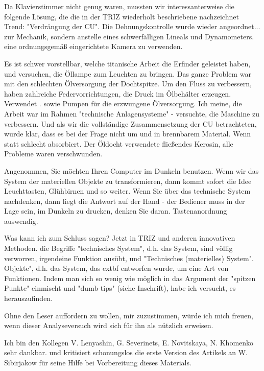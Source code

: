 \documentclass[11pt,a4paper]{article}
\begin{document}
{{Da Klavierstimmer nicht genug waren, mussten wir interessanterweise
die folgende Lösung, die die in der TRIZ wiederholt beschriebene nachzeichnet
Trend: "Verdrängung der CU". Die Dehnungskontrolle wurde wieder angeordnet...
zur Mechanik, sondern anstelle eines schwerfälligen Lineals und Dynamometers.
eine ordnungsgemäß eingerichtete Kamera zu verwenden.

Es ist schwer vorstellbar, welche titanische Arbeit die Erfinder geleistet haben,
und versuchen, die Öllampe zum Leuchten zu bringen. Das ganze Problem war mit den schlechten
Ölversorgung der Dochtspitze. Um den Fluss zu verbessern, haben zahlreiche
Federvorrichtungen, die Druck im Ölbehälter erzeugen. Verwendet .
sowie Pumpen für die erzwungene Ölversorgung. Ich meine, die Arbeit war im Rahmen
"technische Anlagensysteme" - versuchte, die Maschine zu verbessern. 
Und als wir die vollständige Zusammensetzung der CU betrachteten, wurde klar, dass es bei der Frage nicht um
und in brennbarem Material. Wenn statt schlecht absorbiert.
Der Öldocht verwendete fließendes Kerosin, alle Probleme waren verschwunden. 

Angenommen, Sie möchten Ihren Computer im Dunkeln benutzen. Wenn wir
das System der materiellen Objekte zu transformieren, dann kommt sofort die Idee
Leuchttasten, Glühbirnen und so weiter. Wenn Sie über das technische System nachdenken,
dann liegt die Antwort auf der Hand - der Bediener muss in der Lage sein, im Dunkeln zu drucken, denken Sie daran.
Tastenanordnung auswendig.


Was kann ich zum Schluss sagen? Jetzt in TRIZ und anderen innovativen Methoden.
die Begriffe "technisches System", d.h. das System, sind völlig verworren,
\extbf irgendeine Funktion ausübt, und "Technisches (materielles) System".
Objekte", d.h. das System, das extbf entworfen wurde, um eine Art von
Funktionen. Indem man sich so wenig wie möglich in das Argument der "spitzen Punkte" einmischt und
"dumb-tips" (siehe Inschrift), habe ich versucht, es herauszufinden.

Ohne den Leser auffordern zu wollen, mir zuzustimmen, würde ich mich freuen, wenn dieser Analyseversuch
wird sich für ihn als nützlich erweisen.

Ich bin den Kollegen V. Lenyashin, G. Severinets, E. Novitskaya, N. Khomenko sehr dankbar.
und kritisiert schonungslos die erste Version des Artikels an W. Sibirjakow für seine Hilfe bei
Vorbereitung dieses Materials.
}}
\end{document}
